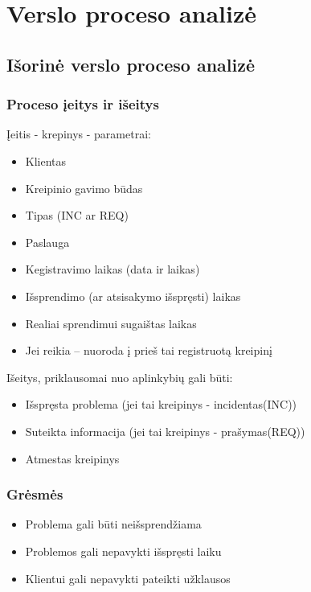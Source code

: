 \section{Verslo proceso analizė}

	\subsection{Išorinė verslo proceso analizė}

		\subsubsection{Proceso įeitys ir išeitys}

			Įeitis - krepinys - parametrai:
			\begin{itemize}
			\item Klientas
			\item Kreipinio gavimo būdas
			\item Tipas (INC ar REQ)
			\item Paslauga
			\item Kegistravimo laikas (data ir laikas)
			\item Išsprendimo (ar atsisakymo išspręsti) laikas
			\item Realiai sprendimui sugaištas laikas
			\item Jei reikia – nuoroda į prieš tai registruotą kreipinį
			\end{itemize}

			Išeitys, priklausomai nuo aplinkybių gali būti:
			\begin{itemize}
				\item Išspręsta problema (jei tai kreipinys - incidentas(INC))
				\item Suteikta informacija (jei tai kreipinys - prašymas(REQ))
				\item Atmestas kreipinys
			\end{itemize}

		\subsubsection{Grėsmės}
			\begin{itemize}
				\item Problema gali būti neišsprendžiama
				\item Problemos gali nepavykti išspręsti laiku
				\item Klientui gali nepavykti pateikti užklausos
			\end{itemize}
			
